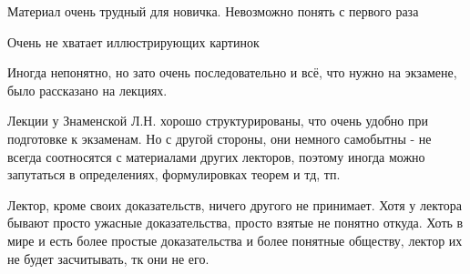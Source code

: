 		\begin{commentbox}
			Материал очень трудный для новичка. Невозможно понять с первого раза
		\end{commentbox}

		\begin{commentbox}
			Очень не хватает иллюстрирующих картинок
		\end{commentbox}

		\begin{commentbox}
			Иногда непонятно, но зато очень последовательно и всё, что нужно на экзамене, было рассказано на лекциях.
		\end{commentbox}

		\begin{commentbox}
			Лекции у Знаменской Л.Н. хорошо структурированы, что очень удобно при подготовке к экзаменам. Но с другой стороны, они немного самобытны - не всегда соотносятся с материалами других лекторов, поэтому иногда можно запутаться в определениях, формулировках теорем и тд, тп.
		\end{commentbox}

		\begin{commentbox}
			Лектор, кроме своих доказательств, ничего другого не принимает. Хотя у лектора бывают просто ужасные доказательства, просто взятые не понятно откуда. Хоть в мире и есть более простые доказательства и более понятные обществу, лектор их не будет засчитывать, тк они не его.
		\end{commentbox}

